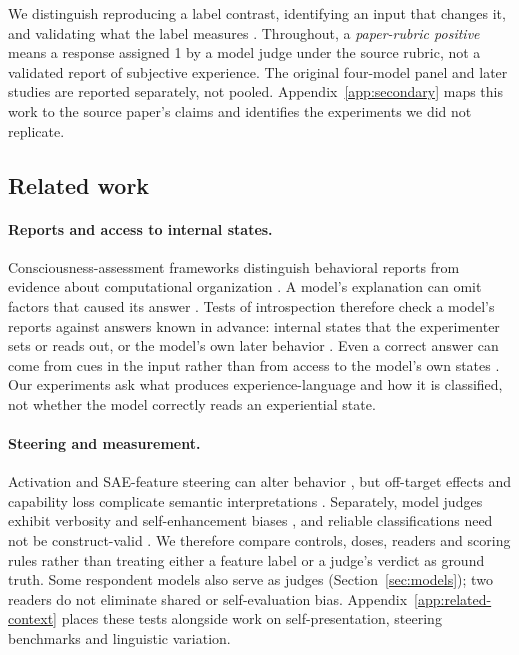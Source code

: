 \documentclass[11pt]{article}
\begin{document}
We distinguish reproducing a label contrast, identifying an input that
changes it, and validating what the label measures
\citep{jacobs2021measurement}. Throughout, a \emph{paper-rubric positive}
means a response assigned 1 by a model judge under the source rubric, not
a validated report of subjective experience. The original four-model panel
and later studies are reported separately, not pooled.
Appendix~\ref{app:secondary} maps this work to the source paper's claims and
identifies the experiments we did not replicate.

\subsection{Related work}
\label{sec:related}

\paragraph{Reports and access to internal states.}
Consciousness-assessment frameworks distinguish behavioral reports from
evidence about computational organization
\citep{butlin2023consciousness,chandaria2026cacophony}.
A model's explanation can omit factors that caused its answer
\citep{turpin2023unfaithful}. Tests of introspection therefore check a
model's reports against answers known in advance: internal states that the
experimenter sets or reads out, or the model's own later behavior
\citep{perez2023selfreports,binder2024looking,lindsey2025introspective}.
Even a correct answer can come from cues in the input rather than from
access to the model's own states \citep{singh2026introspect}. Our
experiments ask what
produces experience-language and how it is classified, not whether the
model correctly reads an experiential state.

\paragraph{Steering and measurement.}
Activation and SAE-feature steering can alter behavior
\citep{turner2023activation,rimsky2024caa,templeton2024scaling}, but off-target
effects and capability loss complicate semantic interpretations
\citep{durmus2024steering}. Separately, model judges exhibit verbosity and
self-enhancement biases \citep{zheng2023llmjudge}, and reliable classifications
need not be construct-valid \citep{chen2026judgeconstruct}.
We therefore compare controls, doses, readers and scoring rules rather than
treating either a feature label or a judge's verdict as ground truth.
Some respondent models also serve as judges
(Section~\ref{sec:models}); two readers do not eliminate shared or
self-evaluation bias. Appendix~\ref{app:related-context} places these tests
alongside work on self-presentation, steering benchmarks and linguistic
variation.
\end{document}
